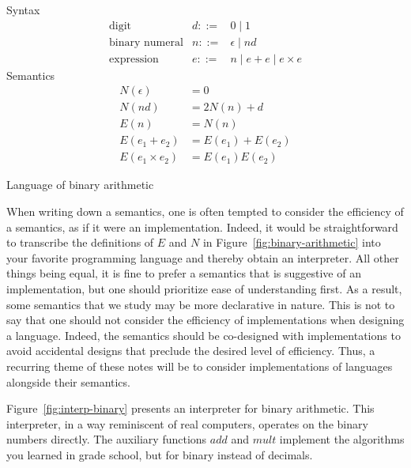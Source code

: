 \documentclass{tufte-handout}
\newcommand{\BR}[1]{(#1)}
\begin{document}
\begin{marginfigure}
\noindent Syntax
\[
\begin{array}{lrl}
 \text{digit}& d ::=& 0 \mid 1 \\
 \text{binary numeral}& n ::=& \epsilon \mid nd  \\
 \text{expression}& e ::=& n \mid e + e \mid e \times e
\end{array}
\]
Semantics
\begin{align*}
 N\BR{ \epsilon } &= 0 \\
 N\BR{ n d } &= 2 N\BR{ n } + d\\[1ex]
 E\BR{ n } &= N\BR{ n } \\
 E\BR{ e_1 + e_2 } &= 
    E\BR{ e_1 } + E\BR{ e_2 } \\
 E\BR{ e_1 \times e_2 } &= 
    E\BR{ e_1 } E\BR{ e_2 }
\end{align*}
\caption{Language of binary arithmetic}
\label{fig:binary-arithmetic}
\end{marginfigure}
%
When writing down a semantics, one is often tempted to consider the
efficiency of a semantics, as if it were an implementation. Indeed, it
would be straightforward to transcribe the definitions of $E$ and $N$
in Figure~\ref{fig:binary-arithmetic} into your favorite programming
language and thereby obtain an interpreter. All other things being
equal, it is fine to prefer a semantics that is suggestive of an
implementation, but one should prioritize ease of understanding first.
As a result, some semantics that we study may be more declarative in
nature. This is not to say that one should not consider the efficiency
of implementations when designing a language.  Indeed, the semantics
should be co-designed with implementations to avoid accidental designs
that preclude the desired level of efficiency.  Thus, a recurring
theme of these notes will be to consider implementations of languages
alongside their semantics.



Figure~\ref{fig:interp-binary} presents an interpreter for binary
arithmetic. This interpreter, in a way reminiscent of real computers,
operates on the binary numbers directly. The auxiliary functions
$\mathit{add}$ and $\mathit{mult}$ implement the algorithms you
learned in grade school, but for binary instead of decimals.
\end{document}
